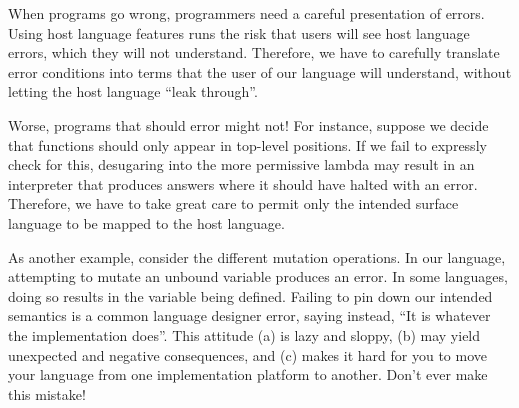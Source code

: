 
When programs go wrong, programmers need a careful presentation of errors. Using
host language features runs the risk that users will see host language errors,
which they will not understand. Therefore, we have to carefully translate error
conditions into terms that the user of our language will understand, without
letting the host language “leak through”.

Worse, programs that should error might not! For instance, suppose we decide
that functions should only appear in top-level positions. If we fail to
expressly check for this, desugaring into the more permissive lambda may result
in an interpreter that produces answers where it should have halted with an
error. Therefore, we have to take great care to permit only the intended surface
language to be mapped to the host language.

As another example, consider the different mutation operations. In our language,
attempting to mutate an unbound variable produces an error. In some languages,
doing so results in the variable being defined. Failing to pin down our intended
semantics is a common language designer error, saying instead, “It is whatever
the implementation does”. This attitude (a) is lazy and sloppy, (b) may yield
unexpected and negative consequences, and (c) makes it hard for you to move your
language from one implementation platform to another. Don’t ever make this
mistake!
